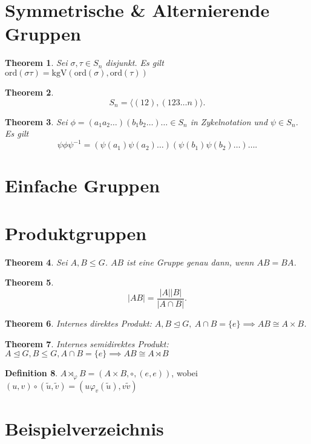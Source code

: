 \documentclass[prb,12pt]{revtex4-2}
\newtheorem{Theorem}{Theorem}
\theoremstyle{definition}
\theoremstyle{definition}
\newtheorem{Definition}[Theorem]{Definition}
\begin{document}
	\section{Symmetrische \& Alternierende Gruppen}
	\begin{Theorem}
		Sei $\sigma, \tau\in S_n$ disjunkt. Es gilt $\text{ord}(\sigma\tau)=\text{kgV}(\text{ord}(\sigma),\text{ord}(\tau))$
	\end{Theorem}
	\begin{Theorem}
		\[
		S_n=\langle (12),(123\dots n)\rangle
		.\] 
	\end{Theorem}
	\begin{Theorem}
		Sei $\phi=(a_1a_2\dots)(b_1b_2\dots)\dots\in S_n$ in Zykelnotation und $\psi\in S_n$. Es gilt
		\[
			\psi\phi\psi^{-1}=(\psi(a_1)\psi(a_2)\dots)(\psi(b_1)\psi(b_2)\dots)\dots
		.\] 
	\end{Theorem}
	\section{Einfache Gruppen}
	\section{Produktgruppen}
	\begin{Theorem}
		Sei  $A,B\le G$. $AB$ ist eine Gruppe genau dann, wenn $AB=BA$.

	\end{Theorem}
	\begin{Theorem}
		\[
		|AB|=\frac{|A| |B|}{|A\cap B|}
		.\] 
	\end{Theorem}
	\begin{Theorem}
		Internes direktes Produkt: $A,B\trianglelefteq G,~A\cap B=\{e\}\implies AB\cong A\times B $.
	\end{Theorem}
	\begin{Theorem}
		Internes semidirektes Produkt: $A\trianglelefteq G, B\le G,A\cap B=\{e\} \implies AB\cong A\rtimes B$
	\end{Theorem}
	\begin{Definition}
		$A\rtimes_{\varphi} B=(A\times B, \circ, (e,e))$, wobei $(u,v)\circ (\tilde{u},\tilde{v})=(u\varphi_{v}(\tilde{u}), v\tilde{v})$
	\end{Definition}
	\section{Beispielverzeichnis}
	
\end{document}
